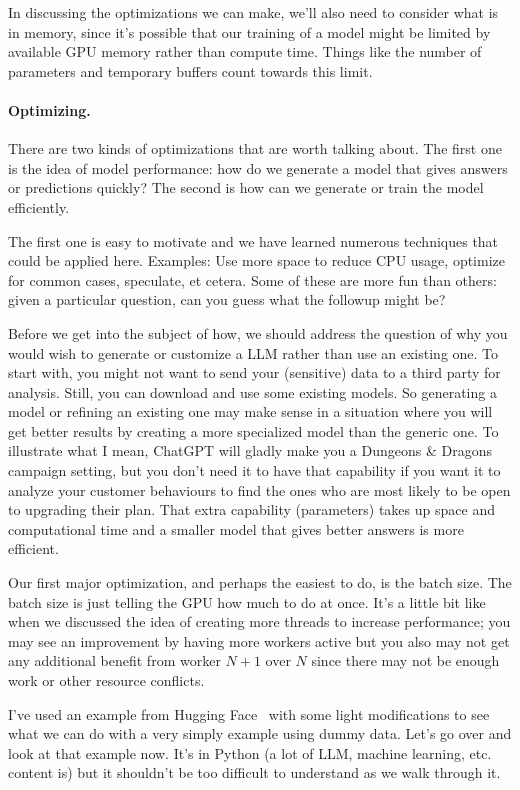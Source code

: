 In discussing the optimizations we can make, we'll also need to consider what is in memory, since it's possible that our training of a model might be limited by available GPU memory rather than compute time. Things like the number of parameters and temporary buffers count towards this limit.

\paragraph{Optimizing.}There are two kinds of optimizations that are worth talking about. The first one is the idea of model performance: how do we generate a model that gives answers or predictions quickly? The second is how can we generate or train the model efficiently.

The first one is easy to motivate and we have learned numerous techniques that could be applied here. Examples: Use more space to reduce CPU usage, optimize for common cases, speculate, et cetera. Some of these are more fun than others: given a particular question, can you guess what the followup might be? 

Before we get into the subject of how, we should address the question of why you would wish to generate or customize a LLM rather than use an existing one. To start with, you might not want to send your (sensitive) data to a third party for analysis. Still, you can download and use some existing models. So generating a model or refining an existing one may make sense in a situation where you will get better results by creating a more specialized model than the generic one. To illustrate what I mean, ChatGPT will gladly make you a Dungeons \& Dragons campaign setting, but you don't need it to have that capability if you want it to analyze your customer behaviours to find the ones who are most likely to be open to upgrading their plan. That extra capability (parameters) takes up space and computational time and a smaller model that gives better answers is more efficient.

Our first major optimization, and perhaps the easiest to do, is the batch size. The batch size is just telling the GPU how much to do at once. It's a little bit like when we discussed the idea of creating more threads to increase performance; you may see an improvement by having more workers active but you also may not get any additional benefit from worker $N+1$ over $N$ since there may not be enough work or other resource conflicts.

I've used an example from Hugging Face~\cite{hf2} with some light modifications to see what we can do with a very simply example using dummy data. Let's go over and look at that example now. It's in Python (a lot of LLM, machine learning, etc. content is) but it shouldn't be too difficult to understand as we walk through it.

